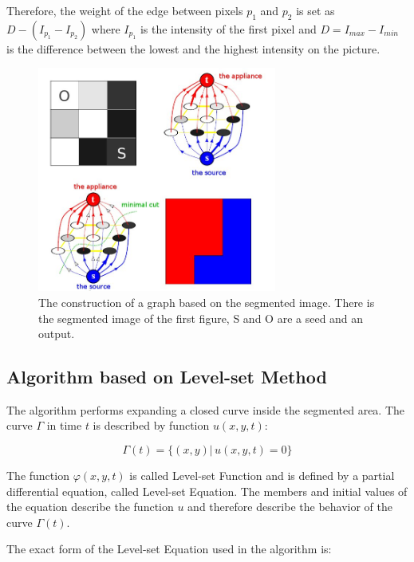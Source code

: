 Therefore, the weight of the edge between pixels $p_{1}$ and $p_{2}$ is set as $D - \left(I_{p_{1}} - I_{p_{2}} \right)$ where $I_{p_{1}}$ is the intensity of the first pixel and $D = I_{max} - I_{min}$ is the difference between the lowest and the highest intensity on the picture.

\begin{figure}[!H]
 	\caption{The construction of a graph based on the segmented image. There is the segmented image of the first figure, S and O are a seed and an output. \label{fig:grafy}}
	\begin{center}
	\includegraphics[width=0.7\textwidth]{Text/IMG/grafy.jpg}
	\end{center}
\end{figure}

\subsection{Algorithm based on Level-set Method}
The algorithm performs expanding a closed curve inside the segmented area. The curve $\Gamma$ in time $t$ is described by function $u(x,y,t)$:

\begin{equation}
\label{lvsfunction}
\Gamma(t) = \{(x, y)|\, u(x,y,t) = 0 \}
\end{equation}

The function $\varphi(x,y,t)$ is called Level-set Function and is defined by a partial differential equation, called Level-set Equation. The members and initial values of the equation describe the function $u$ and therefore describe the behavior of the curve $\Gamma(t)$.

The exact form of the Level-set Equation used in the algorithm is:

